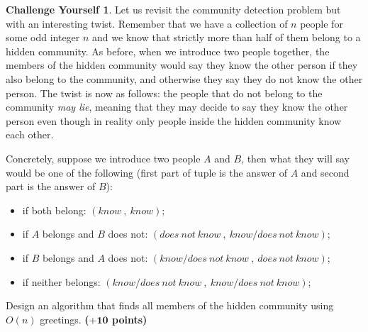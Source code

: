 \documentclass{article}
\theoremstyle{definition}
\newtheorem*{challenge}{Challenge Yourself}
\newcommand{\grade}[1]{\hfill{\textbf{($\mathbf{#1}$ points)}}}
\begin{document}
\begin{challenge}
	Let us revisit the community detection problem but with an interesting twist. Remember that we have a collection of $n$ people for some odd integer $n$ and we know that strictly more than half of them belong to a hidden community. 
	As before, when we introduce two people together, the members of the hidden community would say they know the other person if they also belong to the community, and otherwise they say they do not know the other person. 
	The twist is now as follows: the people that do not belong to the community \emph{may lie}, meaning that they may decide to say they know the other person even though in reality only people inside the hidden community know each other.
	
	Concretely, 
	suppose we introduce two people $A$ and $B$, then what they will say would be one of the following (first part of tuple is the answer of $A$ and second part is the answer of $B$): 
	\begin{itemize}
		\item if both belong: $(know~,~know)$;
		\item if $A$ belongs  and $B$ does not: $(does\ not\ know~,~know/does\ not\ know)$; 
		\item if $B$ belongs  and $A$ does not: $(know/does\ not\ know~,~does\ not\ know)$; 
		\item if neither belongs:  $(know/does\ not\ know~,~know/does\ not\ know)$; 
	\end{itemize}
	Design an algorithm that finds all members of the hidden community using $O(n)$ greetings. \grade{+10} 
\end{challenge}
\end{document}
